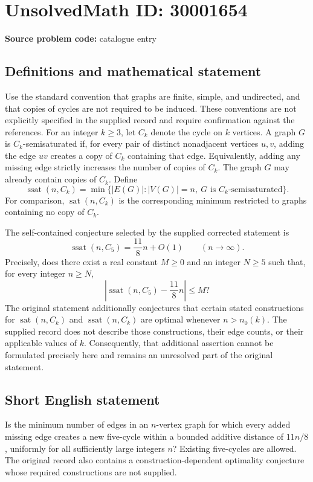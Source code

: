 \documentclass[11pt]{article}
\begin{document}
\section*{UnsolvedMath ID: 30001654}
\textbf{Source problem code:} catalogue entry
\subsection{Definitions and mathematical statement}
Use the standard convention that graphs are finite, simple, and undirected, and that copies of cycles are not required to be induced. These conventions are not explicitly specified in the supplied record and require confirmation against the references. For an integer \(k\ge 3\), let \(C_k\) denote the cycle on \(k\) vertices. A graph \(G\) is \(C_k\)-semisaturated if, for every pair of distinct nonadjacent vertices \(u,v\), adding the edge \(uv\) creates a copy of \(C_k\) containing that edge. Equivalently, adding any missing edge strictly increases the number of copies of \(C_k\). The graph \(G\) may already contain copies of \(C_k\). Define
\[
\operatorname{ssat}(n,C_k)=\min\bigl\{|E(G)|: |V(G)|=n,\ G\text{ is }C_k\text{-semisaturated}\bigr\}.
\]
For comparison, \(\operatorname{sat}(n,C_k)\) is the corresponding minimum restricted to graphs containing no copy of \(C_k\).

The self-contained conjecture selected by the supplied corrected statement is
\[
\operatorname{ssat}(n,C_5)=\frac{11}{8}n+O(1)\qquad(n\to\infty).
\]
Precisely, does there exist a real constant \(M\ge 0\) and an integer \(N\ge 5\) such that, for every integer \(n\ge N\),
\[
\left|\operatorname{ssat}(n,C_5)-\frac{11}{8}n\right|\le M?
\]
The original statement additionally conjectures that certain stated constructions for \(\operatorname{sat}(n,C_k)\) and \(\operatorname{ssat}(n,C_k)\) are optimal whenever \(n>n_0(k)\). The supplied record does not describe those constructions, their edge counts, or their applicable values of \(k\). Consequently, that additional assertion cannot be formulated precisely here and remains an unresolved part of the original statement.
\subsection{Short English statement}
Is the minimum number of edges in an \(n\)-vertex graph for which every added missing edge creates a new five-cycle within a bounded additive distance of \(11n/8\), uniformly for all sufficiently large integers \(n\)? Existing five-cycles are allowed. The original record also contains a construction-dependent optimality conjecture whose required constructions are not supplied.
\end{document}
